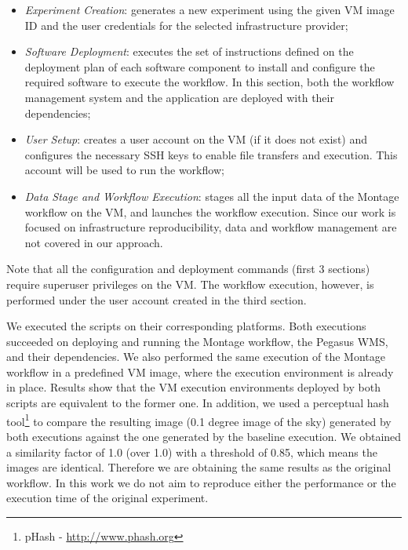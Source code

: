 \documentclass[final,5p,times,twocolumn]{elsarticle}
\begin{document}
\begin{itemize}

	\item \emph{Experiment Creation}: generates a new experiment using the given VM image ID and the user credentials for the selected infrastructure provider;
    	    
	\item \emph{Software Deployment}: executes the set of instructions defined on the deployment plan of each software component to install and configure the required software to execute the workflow. In this section, both the workflow management system and the application are deployed with their dependencies;

	\item \emph{User Setup}: creates a user account on the VM (if it does not exist) and configures the necessary SSH keys to enable file transfers and execution. This account will be used to run the workflow;
	   
	\item \emph{Data Stage and Workflow Execution}: stages all the input data of the Montage workflow on the VM, and launches the workflow execution. Since our work is focused on infrastructure reproducibility, data and workflow management are not covered in our approach.

\end{itemize}

\noindent Note that all the configuration and deployment commands (first 3 sections) require superuser privileges on the VM. The workflow execution, however, is performed under the user account created in the third section.

We executed the scripts on their corresponding platforms. Both executions succeeded on deploying and running the Montage workflow, the Pegasus WMS, and their dependencies. We also performed the same execution of the Montage workflow in a predefined VM image, where the execution environment is already in place. Results show that the VM execution environments deployed by both scripts are equivalent to the former one. In addition, we used a perceptual hash tool\footnote{pHash - \url{http://www.phash.org}} to compare the resulting image (0.1 degree image of the sky) generated by both executions against the one generated by the baseline execution. We obtained a similarity factor of 1.0 (over 1.0) with a threshold of 0.85, which means the images are identical. Therefore we are obtaining the same results as the original workflow. In this work we do not aim to reproduce either the performance or the execution time of the original experiment.
\end{document}

